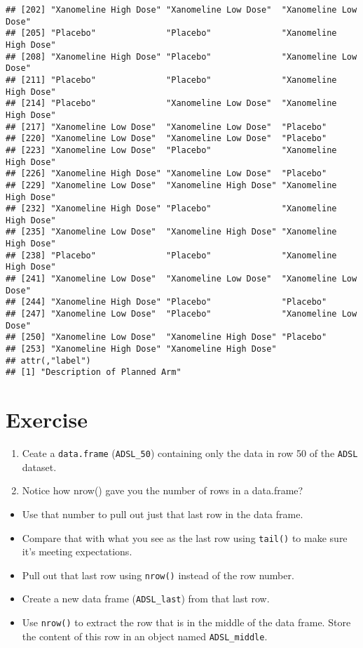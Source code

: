 \documentclass[]{book}
\providecommand{\tightlist}{%
  \setlength{\itemsep}{0pt}\setlength{\parskip}{0pt}}
\begin{document}
\begin{verbatim}
## [202] "Xanomeline High Dose" "Xanomeline Low Dose"  "Xanomeline Low Dose" 
## [205] "Placebo"              "Placebo"              "Xanomeline High Dose"
## [208] "Xanomeline High Dose" "Placebo"              "Xanomeline Low Dose" 
## [211] "Placebo"              "Placebo"              "Xanomeline High Dose"
## [214] "Placebo"              "Xanomeline Low Dose"  "Xanomeline High Dose"
## [217] "Xanomeline Low Dose"  "Xanomeline Low Dose"  "Placebo"             
## [220] "Xanomeline Low Dose"  "Xanomeline Low Dose"  "Placebo"             
## [223] "Xanomeline Low Dose"  "Placebo"              "Xanomeline High Dose"
## [226] "Xanomeline High Dose" "Xanomeline Low Dose"  "Placebo"             
## [229] "Xanomeline Low Dose"  "Xanomeline High Dose" "Xanomeline High Dose"
## [232] "Xanomeline High Dose" "Placebo"              "Xanomeline High Dose"
## [235] "Xanomeline Low Dose"  "Xanomeline High Dose" "Xanomeline High Dose"
## [238] "Placebo"              "Placebo"              "Xanomeline High Dose"
## [241] "Xanomeline Low Dose"  "Xanomeline Low Dose"  "Xanomeline Low Dose" 
## [244] "Xanomeline High Dose" "Placebo"              "Placebo"             
## [247] "Xanomeline Low Dose"  "Placebo"              "Xanomeline Low Dose" 
## [250] "Xanomeline Low Dose"  "Xanomeline High Dose" "Placebo"             
## [253] "Xanomeline High Dose" "Xanomeline High Dose"
## attr(,"label")
## [1] "Description of Planned Arm"
\end{verbatim}

\hypertarget{exercise-1}{%
\section{Exercise}\label{exercise-1}}

\begin{enumerate}
\def\labelenumi{\arabic{enumi}.}
\item
  Ceate a \texttt{data.frame} (\texttt{ADSL\_50}) containing only the data in row 50 of the \texttt{ADSL} dataset.
\item
  Notice how nrow() gave you the number of rows in a data.frame?
\end{enumerate}

\begin{itemize}
\tightlist
\item
  Use that number to pull out just that last row in the data frame.
\item
  Compare that with what you see as the last row using \texttt{tail()} to make sure it's meeting expectations.
\item
  Pull out that last row using \texttt{nrow()} instead of the row number.
\item
  Create a new data frame (\texttt{ADSL\_last}) from that last row.
\item
  Use \texttt{nrow()} to extract the row that is in the middle of the data frame. Store the content of this row in an object named \texttt{ADSL\_middle}.
\end{itemize}
\end{document}
